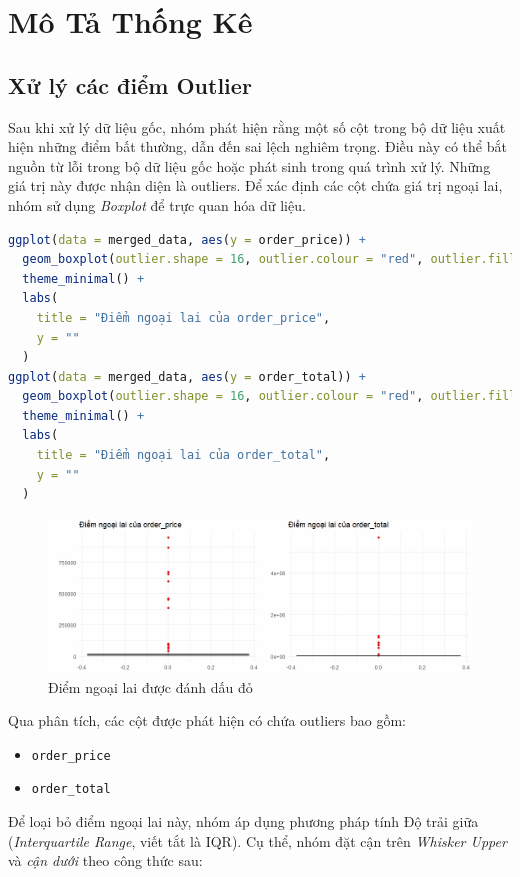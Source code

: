 \section{Mô Tả Thống Kê}
\subsection{Xử lý các điểm Outlier}
Sau khi xử lý dữ liệu gốc, nhóm phát hiện rằng một số cột trong bộ dữ liệu xuất hiện những điểm bất thường, dẫn đến sai lệch nghiêm trọng. Điều này có thể bắt nguồn từ lỗi trong bộ dữ liệu gốc hoặc phát sinh trong quá trình xử lý. Những giá trị này được nhận diện là outliers.
Để xác định các cột chứa giá trị ngoại lai, nhóm sử dụng \textit{Boxplot} để trực quan hóa dữ liệu.
\begin{lstlisting}[language=R, caption=Phát hiện giá trị outlier]
ggplot(data = merged_data, aes(y = order_price)) +
  geom_boxplot(outlier.shape = 16, outlier.colour = "red", outlier.fill = "red") +
  theme_minimal() +
  labs(
    title = "Điểm ngoại lai của order_price",
    y = ""
  )
ggplot(data = merged_data, aes(y = order_total)) +
  geom_boxplot(outlier.shape = 16, outlier.colour = "red", outlier.fill = "red") +
  theme_minimal() +
  labs(
    title = "Điểm ngoại lai của order_total",
    y = ""
  )

\end{lstlisting}

\begin{figure}[!ht]
    \centering \includegraphics[width=15cm]{Images/img/4.2_remove_outlier/ngoai_loai_order_total_order_price.jpg}
    \caption{Điểm ngoại lai được đánh dấu đỏ}
\end{figure}

Qua phân tích, các cột được phát hiện có chứa outliers bao gồm:
\begin{itemize}
    \item \texttt{order\_price}
    \item \texttt{order\_total}
\end{itemize}
Để loại bỏ điểm ngoại lai này, nhóm áp dụng phương pháp tính Độ trải giữa (\textit{Interquartile Range}, viết tắt là IQR). Cụ thể, nhóm đặt cận trên \textit{Whisker Upper} và \textit{cận dưới} theo công thức sau:

